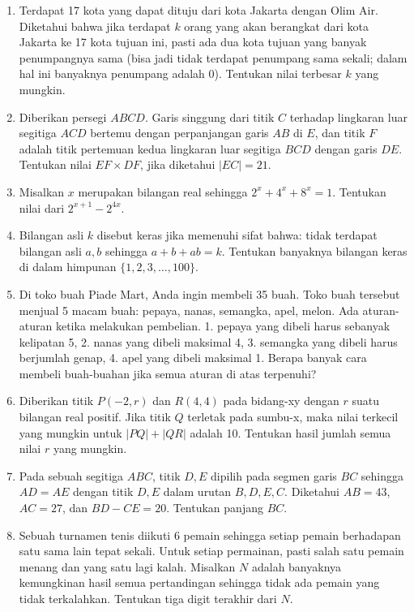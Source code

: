 \documentclass[11pt, a4paper]{article}
\begin{document}
\begin{enumerate}[label=\textbf{No. \arabic*}, leftmargin=*]
    \item Terdapat 17 kota yang dapat dituju dari kota Jakarta dengan Olim Air. Diketahui bahwa jika terdapat $k$ orang yang akan berangkat dari kota Jakarta ke 17 kota tujuan ini, pasti ada dua kota tujuan yang banyak penumpangnya sama (bisa jadi tidak terdapat penumpang sama sekali; dalam hal ini banyaknya penumpang adalah 0). Tentukan nilai terbesar $k$ yang mungkin.

    \item Diberikan persegi $ABCD$. Garis singgung dari titik $C$ terhadap lingkaran luar segitiga $ACD$ bertemu dengan perpanjangan garis $AB$ di $E$, dan titik $F$ adalah titik pertemuan kedua lingkaran luar segitiga $BCD$ dengan garis $DE$. Tentukan nilai $EF \times DF$, jika diketahui $|EC| = 21$.

    \item Misalkan $x$ merupakan bilangan real sehingga $2^x + 4^x + 8^x = 1$. Tentukan nilai dari $2^{x+1} - 2^{4x}$.

    \item Bilangan asli $k$ disebut keras jika memenuhi sifat bahwa: tidak terdapat bilangan asli $a, b$ sehingga $a + b + ab = k$. Tentukan banyaknya bilangan keras di dalam himpunan $\{1, 2, 3, \dots, 100\}$.

    \item Di toko buah Piade Mart, Anda ingin membeli 35 buah. Toko buah tersebut menjual 5 macam buah: pepaya, nanas, semangka, apel, melon. Ada aturan-aturan ketika melakukan pembelian.
    1. pepaya yang dibeli harus sebanyak kelipatan 5,
    2. nanas yang dibeli maksimal 4,
    3. semangka yang dibeli harus berjumlah genap,
    4. apel yang dibeli maksimal 1.
    Berapa banyak cara membeli buah-buahan jika semua aturan di atas terpenuhi?

    \item Diberikan titik $P(-2, r)$ dan $R(4, 4)$ pada bidang-xy dengan $r$ suatu bilangan real positif. Jika titik $Q$ terletak pada sumbu-x, maka nilai terkecil yang mungkin untuk $|PQ| + |QR|$ adalah 10. Tentukan hasil jumlah semua nilai $r$ yang mungkin.

    \item Pada sebuah segitiga $ABC$, titik $D, E$ dipilih pada segmen garis $BC$ sehingga $AD = AE$ dengan titik $D, E$ dalam urutan $B, D, E, C$. Diketahui $AB = 43$, $AC = 27$, dan $BD - CE = 20$. Tentukan panjang $BC$.

    \item Sebuah turnamen tenis diikuti 6 pemain sehingga setiap pemain berhadapan satu sama lain tepat sekali. Untuk setiap permainan, pasti salah satu pemain menang dan yang satu lagi kalah. Misalkan $N$ adalah banyaknya kemungkinan hasil semua pertandingan sehingga tidak ada pemain yang tidak terkalahkan. Tentukan tiga digit terakhir dari $N$.


\end{enumerate}
\end{document}
